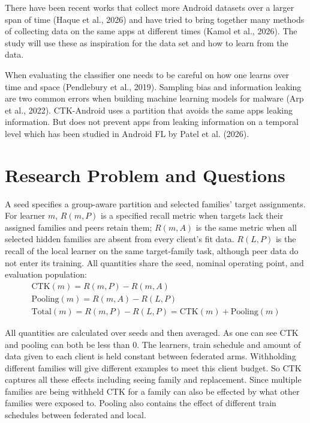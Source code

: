 \documentclass[12pt,letterpaper]{article}
\begin{document}
There have been recent works that collect more Android datasets over a larger span of time (Haque et al., 2026) and have tried to bring together many methods of collecting data on the same apps at different times (Kamol et al., 2026). The study will use these as inspiration for the data set and how to learn from the data.

When evaluating the classifier one needs to be careful on how one learns over time and space (Pendlebury et al., 2019). Sampling bias and information leaking are two common errors when building machine learning models for malware (Arp et al., 2022). CTK-Android uses a partition that avoids the same apps leaking information. But does not prevent apps from leaking information on a temporal level which has been studied in Android FL by Patel et al. (2026). 

\section*{Research Problem and Questions}

A seed specifies a group-aware partition and selected families' target assignments. For learner $m$, $R(m,P)$ is a specified recall metric when targets lack their assigned families and peers retain them; $R(m,A)$ is the same metric when all selected hidden families are absent from every client's fit data. $R(L,P)$ is the recall of the local learner on the same target-family task, although peer data do not enter its training. All quantities share the seed, nominal operating point, and evaluation population:
\begin{gather*}
\mathrm{CTK}(m) = R(m,P) - R(m,A) \\
\mathrm{Pooling}(m) = R(m,A) - R(L,P) \\
\mathrm{Total}(m) = R(m,P) - R(L,P) = \mathrm{CTK}(m) + \mathrm{Pooling}(m)
\end{gather*}

All quantities are calculated over seeds and then averaged. As one can see CTK and pooling can both be less than 0. The learners, train schedule and amount of data given to each client is held constant between federated arms. Withholding different families will give different examples to meet this client budget. So CTK captures all these effects including seeing family and replacement. Since multiple families are being withheld CTK for a family can also be effected by what other families were exposed to. Pooling also contains the effect of different train schedules between federated and local.
\end{document}

